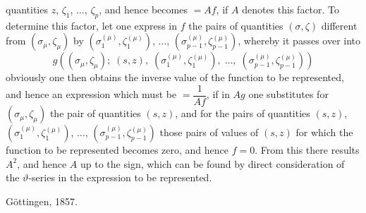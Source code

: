 \documentclass{article}
\begin{document}
quantities $z$, $\zeta_{1}$, $\ldots$, $\zeta_{p}$, and hence becomes $= Af$, if $A$ denotes this factor. To determine this factor, let one express in $f$ the pairs of quantities $(\sigma, \zeta)$ different from $(\sigma_{\mu}, \zeta_{\mu})$ by $(\sigma_{1}^{(\mu)}, \zeta_{1}^{(\mu)})$, $\ldots$, $(\sigma_{p-1}^{(\mu)}, \zeta_{p-1}^{(\mu)})$, whereby it passes over into
\[ g((\sigma_{\mu}, \zeta_{\mu}); \; (s, z), \; (\sigma_{1}^{(\mu)}, \zeta_{1}^{(\mu)}), \; \ldots, \; (\sigma_{p-1}^{(\mu)}, \zeta_{p-1}^{(\mu)})) \]
obviously one then obtains the inverse value of the function to be represented, and hence an expression which must be $= \dfrac{1}{Af}$, if in $Ag$ one substitutes for $(\sigma_{\mu}, \zeta_{\mu})$ the pair of quantities $(s, z)$, and for the pairs of quantities $(s, z)$, $(\sigma_{1}^{(\mu)}, \zeta_{1}^{(\mu)})$, $\ldots$, $(\sigma_{p-1}^{(\mu)}, \zeta_{p-1}^{(\mu)})$ those pairs of values of $(s, z)$ for which the function to be represented becomes zero, and hence $f = 0$. From this there results $A^{2}$, and hence $A$ up to the sign, which can be found by direct consideration of the $\vartheta$-series in the expression to be represented.

Göttingen, 1857.
\end{document}
